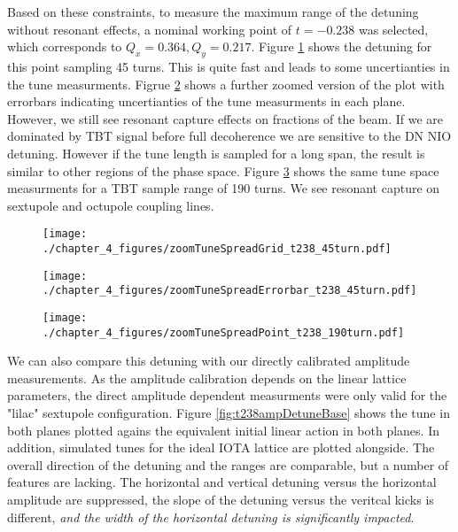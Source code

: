 Based on these constraints, to measure the maximum range of the detuning without resonant effects, a nominal working point of $t=-0.238$ was selected, which corresponds to $Q_x = 0.364, Q_y = 0.217$. Figure \ref{fig:t238detune45} shows the detuning for this point sampling 45 turns. This is quite fast and leads to some uncertianties in the tune measurments. Figrue \ref{fig:t238detune45Error} shows a further zoomed version of the plot with errorbars indicating uncertianties of the tune measurments in each plane. However, we still see resonant capture effects on fractions of the beam. If we are dominated by TBT signal before full decoherence we are sensitive to the DN NIO detuning. However if the tune length is sampled for a long span, the result is similar to other regions of the phase space. Figure \ref{fig:t238detune190} shows the same tune space measurments for a TBT sample range of 190 turns. We see resonant capture on sextupole and octupole coupling lines.

\begin{figure}
	\centering
	\texttt{[image: ./chapter\_4\_figures/zoomTuneSpreadGrid\_t238\_45turn.pdf]}
	\caption{}
	\label{fig:t238detune45}
\end{figure}


\begin{figure}
	\centering
	\texttt{[image: ./chapter\_4\_figures/zoomTuneSpreadErrorbar\_t238\_45turn.pdf]}
	\caption{}
	\label{fig:t238detune45Error}
\end{figure}

\begin{figure}
	\centering
	\texttt{[image: ./chapter\_4\_figures/zoomTuneSpreadPoint\_t238\_190turn.pdf]}
	\caption{}
	\label{fig:t238detune190}
\end{figure}


We can also compare this detuning with our directly calibrated amplitude measurements. As the amplitude calibration depends on the linear lattice parameters, the direct amplitude dependent measurments were only valid for the "lilac" sextupole configuration. Figure \ref{fig:t238ampDetuneBase} shows the tune in both planes plotted agains the equivalent initial linear action in both planes. In addition, simulated tunes for the ideal IOTA lattice are plotted alongside. The overall direction of the detuning and the ranges are comparable, but a number of features are lacking. The horizontal and vertical detuning versus the horizontal amplitude are suppressed, the slope of the detuning versus the veritcal kicks is different, \textit{and the width of the horizontal detuning is significantly impacted}.

